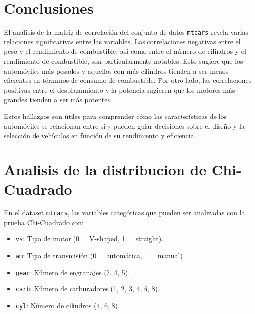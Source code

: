 \documentclass{article}
\begin{document}
\section{Conclusiones}
El análisis de la matriz de correlación del conjunto de datos \texttt{mtcars} revela varias relaciones significativas entre las variables. Las correlaciones negativas entre el peso y el rendimiento de combustible, así como entre el número de cilindros y el rendimiento de combustible, son particularmente notables. Esto sugiere que los automóviles más pesados y aquellos con más cilindros tienden a ser menos eficientes en términos de consumo de combustible. Por otro lado, las correlaciones positivas entre el desplazamiento y la potencia sugieren que los motores más grandes tienden a ser más potentes.

Estos hallazgos son útiles para comprender cómo las características de los automóviles se relacionan entre sí y pueden guiar decisiones sobre el diseño y la selección de vehículos en función de su rendimiento y eficiencia.
\section{Analisis de la distribucion de Chi-Cuadrado}
En el dataset \texttt{mtcars}, las variables categóricas que pueden ser analizadas con la prueba Chi-Cuadrado son:
\begin{itemize}
    \item \texttt{vs}: Tipo de motor (0 = V-shaped, 1 = straight).
    \item \texttt{am}: Tipo de transmisión (0 = automática, 1 = manual).
    \item \texttt{gear}: Número de engranajes (3, 4, 5).
    \item \texttt{carb}: Número de carburadores (1, 2, 3, 4, 6, 8).
    \item \texttt{cyl}: Número de cilindros (4, 6, 8).
\end{itemize}
\end{document}
